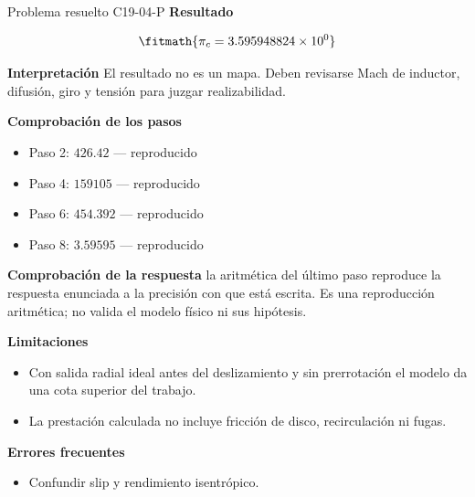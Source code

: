 \documentclass[10pt,openany]{book}
\begin{document}
\begin{studiumworked}{Problema resuelto C19-04-P}
\noindent\textbf{Resultado}

\[
\fitmath{\pi_c=3.595948824\times10^{0}}
\]

\noindent\textbf{Interpretación}
El resultado no es un mapa. Deben revisarse Mach de inductor, difusión, giro y tensión para juzgar realizabilidad.

\noindent\textbf{Comprobación de los pasos}
\begin{itemize}
\item Paso 2: $426.42$ — reproducido
\item Paso 4: $159105$ — reproducido
\item Paso 6: $454.392$ — reproducido
\item Paso 8: $3.59595$ — reproducido
\end{itemize}

\noindent\textbf{Comprobación de la respuesta} la aritmética del último paso reproduce la respuesta enunciada a la precisión con que está escrita. Es una reproducción aritmética; no valida el modelo físico ni sus hipótesis.

\noindent\textbf{Limitaciones}
\begin{itemize}
\item Con salida radial ideal antes del deslizamiento y sin prerrotación el modelo da una cota superior del trabajo.
\item La prestación calculada no incluye fricción de disco, recirculación ni fugas.
\end{itemize}

\noindent\textbf{Errores frecuentes}
\begin{itemize}
\item Confundir slip y rendimiento isentrópico.
\end{itemize}
\begin{center}\end{center}
\end{studiumworked}
\end{document}
